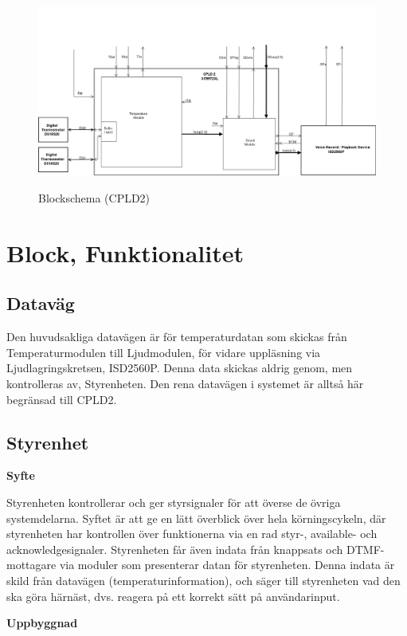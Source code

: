\documentclass[a4paper,11pt]{article}
\begin{document}
	\begin{figure}[ht!]
	  \centering
	      \includegraphics[scale=0.48, angle=90]{BlockDiagramCPLD2.png}
		\label{fig:BlockDiagram2}
	  	\caption{Blockschema (CPLD2)}
	\end{figure}

\section{Block, Funktionalitet}

	\subsection{Dataväg}

Den huvudsakliga datavägen är för temperaturdatan som skickas från Temperaturmodulen till Ljudmodulen,
för vidare uppläsning via Ljudlagringskretsen, ISD2560P. Denna data skickas aldrig genom, men kontrolleras av,
Styrenheten. Den rena datavägen i systemet är alltså här begränsad till CPLD2.

	\subsection{Styrenhet}

{\bf Syfte}

Styrenheten kontrollerar och ger styrsignaler för att överse de övriga systemdelarna. Syftet är att ge en
lätt överblick över hela körningscykeln, där styrenheten har kontrollen över funktionerna via en rad styr-,
available- och acknowledgesignaler. Styrenheten får även indata från knappsats och DTMF-mottagare via moduler
som presenterar datan för styrenheten. Denna indata är skild från datavägen (temperaturinformation), och säger
till styrenheten vad den ska göra härnäst, dvs. reagera på ett korrekt sätt på användarinput.

{\noindent \bf Uppbyggnad}
\end{document}

